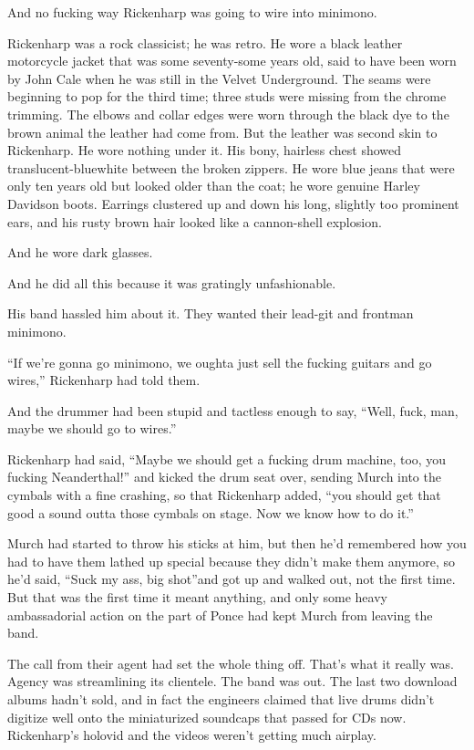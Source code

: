 And no fucking way Rickenharp was going to wire into minimono.

Rickenharp was a rock classicist; he was retro. He wore a black leather motorcycle jacket that was some seventy-some years old, said to have been worn by John Cale when he was still in the Velvet Underground. The seams were beginning to pop for the third time; three studs were missing from the chrome trimming. The elbows and collar edges were worn through the black dye to the brown animal the leather had come from. But the leather was second skin to Rickenharp. He wore nothing under it. His bony, hairless chest showed translucent-bluewhite between the broken zippers. He wore blue jeans that were only ten years old but looked older than the coat; he wore genuine Harley Davidson boots. Earrings clustered up and down his long, slightly too prominent ears, and his rusty brown hair looked like a cannon-shell explosion.

And he wore dark glasses.

And he did all this because it was gratingly unfashionable.

His band hassled him about it. They wanted their lead-git and frontman minimono.

``If we're gonna go minimono, we oughta just sell the fucking guitars and go wires,'' Rickenharp had told them.

And the drummer had been stupid and tactless enough to say, ``Well, fuck, man, maybe we should go to wires.''

Rickenharp had said, ``Maybe we should get a fucking drum machine, too, you fucking Neanderthal!'' and kicked the drum seat over, sending Murch into the cymbals with a fine crashing, so that Rickenharp added, ``you should get that good a sound outta those cymbals on stage. Now we know how to do it.''

Murch had started to throw his sticks at him, but then he'd remembered how you had to have them lathed up special because they didn't make them anymore, so he'd said, ``Suck my ass, big shot''and got up and walked out, not the first time. But that was the first time it meant anything, and only some heavy ambassadorial action on the part of Ponce had kept Murch from leaving the band.

The call from their agent had set the whole thing off. That's what it really was. Agency was streamlining its clientele. The band was out. The last two download albums hadn't sold, and in fact the engineers claimed that live drums didn't digitize well onto the miniaturized soundcaps that passed for CDs now. Rickenharp's holovid and the videos weren't getting much airplay.

